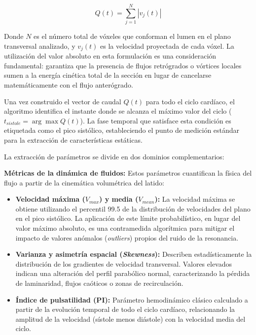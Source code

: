 \begin{equation}
    Q(t) = \sum_{j=1}^{N} |v_j(t)| 
    \label{eq:caudal}
\end{equation}

Donde $N$ es el número total de vóxeles que conforman el lumen en el plano transversal analizado, y $v_j(t)$ es la velocidad proyectada de cada vóxel. La utilización del valor absoluto en esta formulación es una consideración fundamental: garantiza que la presencia de flujos retrógrados o vórtices locales sumen a la energía cinética total de la sección en lugar de cancelarse matemáticamente con el flujo anterógrado.

Una vez construido el vector de caudal $Q(t)$ para todo el ciclo cardíaco, el algoritmo identifica el instante donde se alcanza el máximo valor del ciclo ($t_{sistole} = \arg\max Q(t)$). La fase temporal que satisface esta condición es etiquetada como el pico sistólico, estableciendo el punto de medición estándar para la extracción de características estáticas.

La extracción de parámetros se divide en dos dominios complementarios:

\textbf{Métricas de la dinámica de fluidos:} Estos parámetros cuantifican la física del flujo a partir de la cinemática volumétrica del latido:
\begin{itemize}
    \item \textbf{Velocidad máxima ($V_{max}$) y media ($V_{mean}$):} La velocidad máxima se obtiene utilizando el percentil 99.5 de la distribución de velocidades del plano en el pico sistólico. La aplicación de este límite probabilístico, en lugar del valor máximo absoluto, es una contramedida algorítmica para mitigar el impacto de valores anómalos (\textit{outliers}) propios del ruido de la resonancia.
    
    \item \textbf{Varianza y asimetría espacial (\textit{Skewness}):} Describen estadísticamente la distribución de los gradientes de velocidad transversal. Valores elevados indican una alteración del perfil parabólico normal, caracterizando la pérdida de laminaridad, flujos caóticos o zonas de recirculación.
    
    \item \textbf{Índice de pulsatilidad (PI):} Parámetro hemodinámico clásico calculado a partir de la evolución temporal de todo el ciclo cardíaco, relacionando la amplitud de la velocidad (sístole menos diástole) con la velocidad media del ciclo.
\end{itemize}

